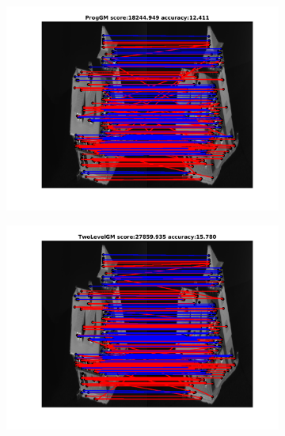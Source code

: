 \documentclass[
	fontsize=12pt,
	paper=a4,
	twoside=false,
	numbers=noenddot,
	plainheadsepline,
	toc=listof,
	toc=bibliography
]{scrartcl}
\begin{document}
\begin{figure}[h] 		
	\begin{subfigure}[b]{0.3\textwidth}
		\centering
		\includegraphics[scale=0.25]{"fig_ver2608/RealImages/HouseSeq/no_descr/using_cpd_afftrafo/solution/fi_1_ProgGM"}  
	\end{subfigure}%
	\begin{subfigure}[b]{0.3\textwidth}
		\centering
		\includegraphics[scale=0.25]{"fig_ver2608/RealImages/HouseSeq/no_descr/using_cpd_afftrafo/solution/fi_1_TwoLevelGM"}  
	\end{subfigure} 
	\begin{subfigure}[b]{0.3\textwidth}
		\centering

\end{subfigure}
\end{figure}
\end{document}
